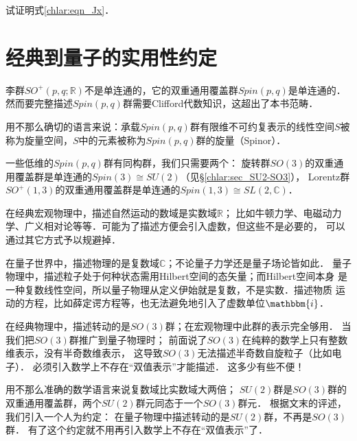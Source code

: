 \begin{exercise}
	试证明式\eqref{chlar:eqn_Jx}．
\end{exercise}



\section{经典到量子的实用性约定}\label{chlar:sec_C2Q}



李群$SO^{+}(p,q;\mathbb{R})$不是单连通的，它的双重通用覆盖群$Spin(p,q)$是单连通的．
然而要完整描述$Spin(p,q)$群需要Clifford代数知识，这超出了本书范畴．

用不那么确切的语言来说：承载$Spin(p,q)$群有限维不可约复表示的线性空间$S$被
称为{\heiti 旋量空间}，$S$中的元素被称为$Spin(p,q)$群的{\heiti 旋量}（Spinor）．



一些低维的$Spin(p,q)$群有同构群，我们只需要两个：
旋转群$SO(3)$的双重通用覆盖群是单连通的$Spin(3)  \cong SU(2)$（见\S\ref{chlar:sec_SU2-SO3}），
Lorentz群$SO^{+}(1,3)$的双重通用覆盖群是单连通的$Spin(1,3)\cong SL(2,\mathbb{C})$．

在经典宏观物理中，描述自然运动的数域是实数域$\mathbb{R}$；
比如牛顿力学、电磁动力学、广义相对论等等．可能为了描述方便会引入虚数，但这些不是必要的，
可以通过其它方式予以规避掉．

在量子世界中，描述物理的是复数域$\mathbb{C}$；不论量子力学还是量子场论皆如此．
量子物理中，描述粒子处于何种状态需用Hilbert空间的态矢量；而Hilbert空间本身
是一种复数线性空间，所以量子物理从定义伊始就是复数，不是实数．描述物质
运动的方程，比如薛定谔方程等，也无法避免地引入了虚数单位$\mathbbm{i}$．

在经典物理中，描述转动的是$SO(3)$群；在宏观物理中此群的表示完全够用．
当我们把$SO(3)$群推广到量子物理时；
前面说了$SO(3)$在纯粹的数学上只有整数维表示，没有半奇数维表示，
这导致$SO(3)$无法描述半奇数自旋粒子（比如电子）．
必须引入数学上不存在“双值表示”才能描述．
这多少有些不便！

用不那么准确的数学语言来说复数域比实数域大两倍；
$SU(2)$群是$SO(3)$群的双重通用覆盖群，两个$SU(2)$群元同态于一个$SO(3)$群元．
根据\textcite[\S 2.7]{weinberg_vol1}文末的评述，
我们引入一个人为约定：
{\kaishu 在量子物理中描述转动的是$SU(2)$群，不再是$SO(3)$群．}
有了这个约定就不用再引入数学上不存在“双值表示”了．

